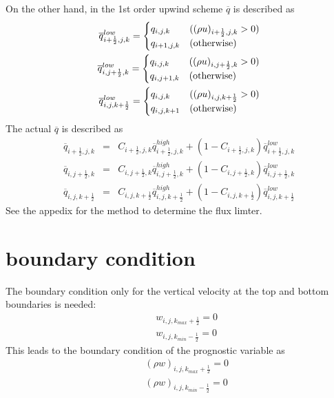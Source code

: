 \begin{description}
On the other hand, in the 1st order upwind scheme 
$\overline{q}$ is described as
\begin{eqnarray}
\overline{q}_{i+\frac{1}{2},j,k}^{low} =
\begin{cases}
  q_{i,j,k} & ( (\rho u)_{i+\frac{1}{2},j,k}>0 )\\
  q_{i+1,j,k} & ({\rm otherwise})\\
\end{cases}
\\
\overline{q}_{i,j+\frac{1}{2},k}^{low} =
\begin{cases}
  q_{i,j,k} & ( (\rho u)_{i,j+\frac{1}{2},k}>0 )\\
  q_{i,j+1,k} & ({\rm otherwise})\\
\end{cases}
\\
\overline{q}_{i,j,k+\frac{1}{2}}^{low} =
\begin{cases}
  q_{i,j,k} & ( (\rho u)_{i,j,k+\frac{1}{2}}>0 )\\
  q_{i,j,k+1} & ({\rm otherwise})\\
\end{cases}
\end{eqnarray}
The actual $\overline{q}$ is described as
\begin{eqnarray}
  \overline{q}_{i+\frac{1}{2},j,k}
&=& C_{i+\frac{1}{2},j,k} \overline{q}_{i+\frac{1}{2},j,k}^{high}
+ \left( 1 - C_{i+\frac{1}{2},j,k}\right) \overline{q}_{i+\frac{1}{2},j,k}^{low}\\
  \overline{q}_{i,j+\frac{1}{2},k}
&=& C_{i,j+\frac{1}{2},k} \overline{q}_{i,j+\frac{1}{2},k}^{high}
+ \left( 1 - C_{i,j+\frac{1}{2},k}\right) \overline{q}_{i,j+\frac{1}{2},k}^{low}\\
  \overline{q}_{i,j,k+\frac{1}{2}}
&=& C_{i,j,k+\frac{1}{2}} \overline{q}_{i,j,k+\frac{1}{2}}^{high}
+ \left( 1 - C_{i,j,k+\frac{1}{2}}\right) \overline{q}_{i,j,k+\frac{1}{2}}^{low}
\end{eqnarray}
See the appedix for the method to determine the flux limter.
\end{description}



\section{boundary condition}
The boundary condition only for the vertical velocity at the top and bottom
boundaries is needed:
\begin{eqnarray}
&&  w_{i,j,k_{max}+\frac{1}{2}} = 0\\
&&  w_{i,j,k_{min}-\frac{1}{2}} = 0
\end{eqnarray}
This leads to the boundary condition of the prognostic variable as
\begin{eqnarray}
&&  (\rho w)_{i,j,k_{max}+\frac{1}{2}} = 0\\
&&  (\rho w)_{i,j,k_{min}-\frac{1}{2}} = 0
\end{eqnarray}



